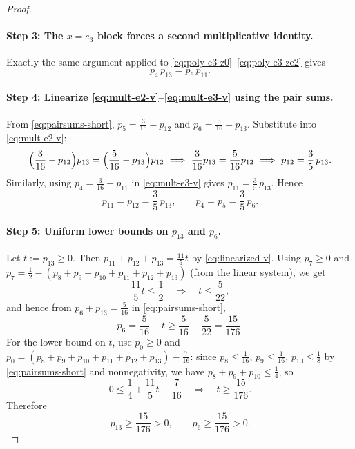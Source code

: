 \documentclass[11pt]{article}
\begin{document}
\begin{proof}
\paragraph{Step 3: The $x=e_3$ block forces a second multiplicative identity.}
Exactly the same argument applied to \eqref{eq:poly-e3-z0}--\eqref{eq:poly-e3-ze2} gives
\begin{equation}
\label{eq:mult-e3-v}
p_4\,p_{13}=p_6\,p_{11}.
\end{equation}

\paragraph{Step 4: Linearize \eqref{eq:mult-e2-v}--\eqref{eq:mult-e3-v} using the pair sums.}
From \eqref{eq:pairsums-short}, $p_5=\frac{3}{16}-p_{12}$ and $p_6=\frac{5}{16}-p_{13}$.
Substitute into \eqref{eq:mult-e2-v}:
\[
\Bigl(\frac{3}{16}-p_{12}\Bigr)p_{13}=\Bigl(\frac{5}{16}-p_{13}\Bigr)p_{12}
\ \Longrightarrow\
\frac{3}{16}p_{13}=\frac{5}{16}p_{12}
\ \Longrightarrow\
p_{12}=\frac35\,p_{13}.
\]
Similarly, using $p_4=\frac{3}{16}-p_{11}$ in \eqref{eq:mult-e3-v} gives $p_{11}=\frac35\,p_{13}$.
Hence
\begin{equation}
\label{eq:linearized-v}
p_{11}=p_{12}=\frac35\,p_{13},
\qquad
p_4=p_5=\frac35\,p_6.
\end{equation}

\paragraph{Step 5: Uniform lower bounds on $p_{13}$ and $p_6$.}
Let $t:=p_{13}\ge 0$.
Then $p_{11}+p_{12}+p_{13}=\frac{11}{5}t$ by \eqref{eq:linearized-v}.
Using $p_7\ge 0$ and $p_7=\frac12-(p_8+p_9+p_{10}+p_{11}+p_{12}+p_{13})$ (from the linear system),
we get
\[
\frac{11}{5}t\le \frac12\quad\Longrightarrow\quad t\le \frac{5}{22},
\]
and hence from $p_6+p_{13}=\frac{5}{16}$ in \eqref{eq:pairsums-short},
\[
p_6=\frac{5}{16}-t\ge \frac{5}{16}-\frac{5}{22}=\frac{15}{176}.
\]
For the lower bound on $t$, use $p_0\ge 0$ and
$p_0=(p_8+p_9+p_{10}+p_{11}+p_{12}+p_{13})-\frac{7}{16}$:
since $p_8\le\frac{1}{16}$, $p_9\le\frac{1}{16}$, $p_{10}\le\frac18$ by \eqref{eq:pairsums-short} and nonnegativity,
we have $p_8+p_9+p_{10}\le\frac14$, so
\[
0\le \frac14+\frac{11}{5}t-\frac{7}{16}
\quad\Longrightarrow\quad
t\ge \frac{15}{176}.
\]
Therefore
\begin{equation}
\label{eq:bounds-v}
p_{13}\ge \frac{15}{176}>0,
\qquad
p_6\ge \frac{15}{176}>0.
\end{equation}


\end{proof}
\end{document}
